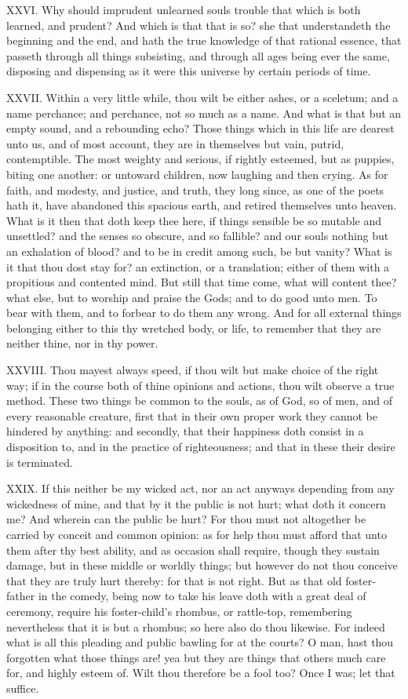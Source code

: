 XXVI. Why should imprudent unlearned souls trouble that which is
both learned, and prudent? And which is that that is so? she that
understandeth the beginning and the end, and hath the true knowledge of
that rational essence, that passeth through all things subsisting, and
through all ages being ever the same, disposing and dispensing as it were
this universe by certain periods of time.

XXVII. Within a very little while, thou wilt be either ashes, or a
sceletum; and a name perchance; and perchance, not so much as a name. And
what is that but an empty sound, and a rebounding echo? Those things which
in this life are dearest unto us, and of most account, they are in
themselves but vain, putrid, contemptible. The most weighty and serious,
if rightly esteemed, but as puppies, biting one another: or untoward
children, now laughing and then crying. As for faith, and modesty, and
justice, and truth, they long since, as one of the poets hath it, have
abandoned this spacious earth, and retired themselves unto heaven. What is
it then that doth keep thee here, if things sensible be so mutable and
unsettled? and the senses so obscure, and so fallible? and our souls
nothing but an exhalation of blood? and to be in credit among such, be but
vanity? What is it that thou dost stay for? an extinction, or a
translation; either of them with a propitious and contented mind. But
still that time come, what will content thee? what else, but to worship
and praise the Gods; and to do good unto men. To bear with them, and to
forbear to do them any wrong. And for all external things belonging either
to this thy wretched body, or life, to remember that they are neither
thine, nor in thy power.

XXVIII. Thou mayest always speed, if thou wilt but make choice of the
right way; if in the course both of thine opinions and actions, thou wilt
observe a true method. These two things be common to the souls, as of God,
so of men, and of every reasonable creature, first that in their own
proper work they cannot be hindered by anything: and secondly, that their
happiness doth consist in a disposition to, and in the practice of
righteousness; and that in these their desire is terminated.

XXIX. If this neither be my wicked act, nor an act anyways depending
from any wickedness of mine, and that by it the public is not hurt; what
doth it concern me? And wherein can the public be hurt? For thou must not
altogether be carried by conceit and common opinion: as for help thou must
afford that unto them after thy best ability, and as occasion shall
require, though they sustain damage, but in these middle or worldly
things; but however do not thou conceive that they are truly hurt thereby:
for that is not right. But as that old foster-father in the comedy, being
now to take his leave doth with a great deal of ceremony, require his
foster-child's rhombus, or rattle-top, remembering nevertheless that it is
but a rhombus; so here also do thou likewise. For indeed what is all this
pleading and public bawling for at the courts? O man, hast thou forgotten
what those things are! yea but they are things that others much care for,
and highly esteem of. Wilt thou therefore be a fool too? Once I was; let
that suffice.

